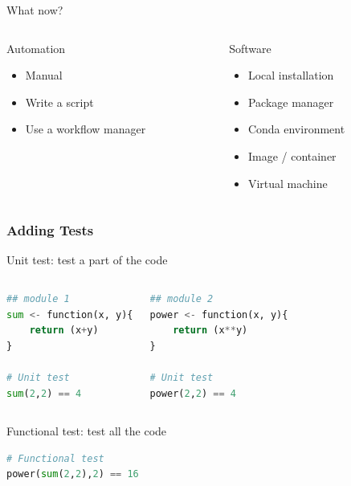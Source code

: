 \begin{frame}{What now?}

\begin{columns}

\begin{column}{.5\textwidth}
    Automation\newline
    
    \begin{itemize}
        \item Manual
        \item Write a script
        \item Use a workflow manager
    \end{itemize}
\end{column}

\begin{column}{.5\textwidth}
    Software\newline
    
    \begin{itemize}
        \item Local installation
        \item Package manager
        \item Conda environment
        \item Image / container
        \item Virtual machine
    \end{itemize}
\end{column}

\end{columns}

\end{frame}

\begin{frame}[containsverbatim]
\frametitle{Adding Tests}
\begin{block}{Unit test: test a part of the code}
\begin{columns}
\begin{lstlisting}[language=python]
## module 1
sum <- function(x, y){
    return (x+y)
}

# Unit test
sum(2,2) == 4
\end{lstlisting}
\begin{lstlisting}[language=python]
## module 2
power <- function(x, y){
    return (x**y)
}

# Unit test
power(2,2) == 4
\end{lstlisting}
\end{columns}
\end{block}
\begin{block}{Functional test: test all the code}
\begin{lstlisting}[language=python]
# Functional test
power(sum(2,2),2) == 16
\end{lstlisting}
\end{block}
\end{frame}


